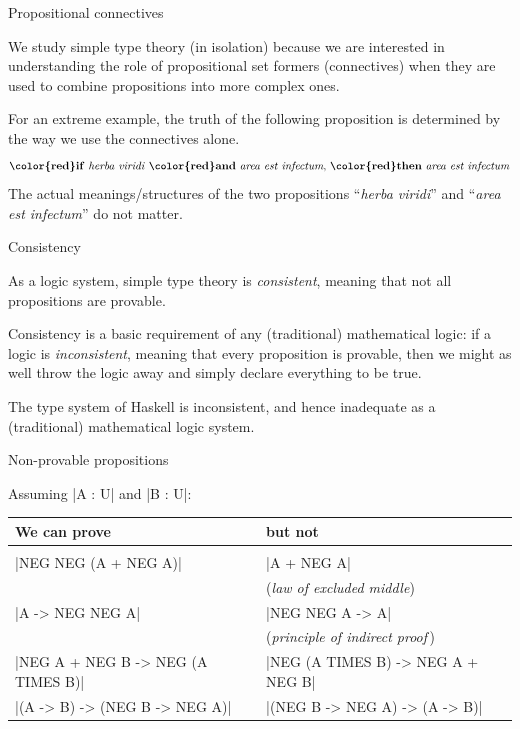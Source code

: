 \documentclass[t,compress,hyperref={hidelinks}]{beamer}
\begin{document}
\begin{frame}{Propositional connectives}

We study simple type theory (in isolation) because we are interested in understanding the role of propositional set formers (connectives) when they are used to combine propositions into more complex ones.

For an extreme example, the truth of the following proposition is determined by the way we use the connectives alone.
\[ \text{\textbf{\color{red}if} \textit{herba viridi} \textbf{\color{red}and} \textit{area est infectum}, \textbf{\color{red}then} \textit{area est infectum}} \]
The actual meanings/structures of the two propositions ``\textit{herba viridi}'' and ``\textit{area est infectum}'' do not matter.

\end{frame}

\begin{frame}{Consistency}

As a logic system, simple type theory is \emph{consistent}, meaning that not all propositions are provable.

Consistency is a basic requirement of any (traditional) mathematical logic: if a logic is \emph{inconsistent}, meaning that every proposition is provable, then we might as well throw the logic away and simply declare everything to be true.

The type system of Haskell is inconsistent, and hence inadequate as a (traditional) mathematical logic system.

\end{frame}

\begin{frame}{Non-provable propositions}

Assuming |A : U| and |B : U|:
\begin{center}
\begin{tabular}{ll}
We can prove & but not \\ \hline \\[-2ex]
|NEG NEG (A + NEG A)| & |A + NEG A| \\
& (\emph{law of excluded middle}) \\
|A -> NEG NEG A| & |NEG NEG A -> A| \\
& (\emph{principle of indirect proof}\,) \\
|NEG A + NEG B -> NEG (A TIMES B)| & |NEG (A TIMES B) -> NEG A + NEG B| \\
|(A -> B) -> (NEG B -> NEG A)| & |(NEG B -> NEG A) -> (A -> B)|
\end{tabular}
\end{center}

\end{frame}
\end{document}

